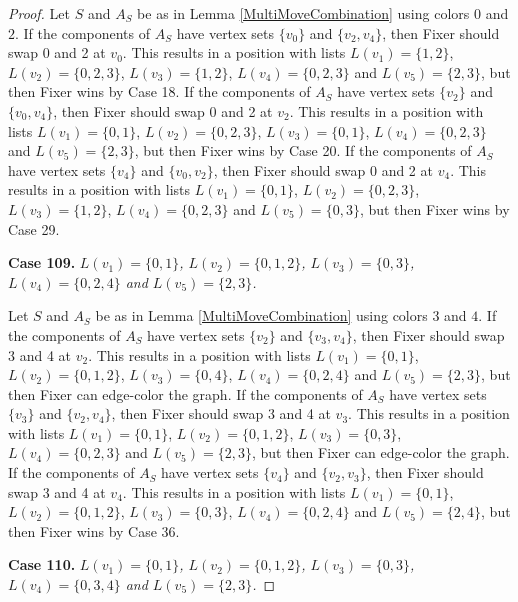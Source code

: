 \documentclass[12pt]{amsart}
\theoremstyle{plain}
\theoremstyle{definition}
\theoremstyle{remark}
\begin{document}
\begin{proof}
Let $S$ and $A_S$ be as in Lemma \ref{MultiMoveCombination} using colors $0$ and $2$. If the components of $A_S$ have vertex sets $\{v_0\}$ and $\{v_2, v_4\}$, then Fixer should swap 0 and 2 at $v_0$. This results in a position with lists $L(v_1) = \{1, 2\}$, $L(v_2) = \{0, 2, 3\}$, $L(v_3) = \{1, 2\}$, $L(v_4) = \{0, 2, 3\}$ and $L(v_5) = \{2, 3\}$, but then Fixer wins by Case 18.
If the components of $A_S$ have vertex sets $\{v_2\}$ and $\{v_0, v_4\}$, then Fixer should swap 0 and 2 at $v_2$. This results in a position with lists $L(v_1) = \{0, 1\}$, $L(v_2) = \{0, 2, 3\}$, $L(v_3) = \{0, 1\}$, $L(v_4) = \{0, 2, 3\}$ and $L(v_5) = \{2, 3\}$, but then Fixer wins by Case 20.
If the components of $A_S$ have vertex sets $\{v_4\}$ and $\{v_0, v_2\}$, then Fixer should swap 0 and 2 at $v_4$. This results in a position with lists $L(v_1) = \{0, 1\}$, $L(v_2) = \{0, 2, 3\}$, $L(v_3) = \{1, 2\}$, $L(v_4) = \{0, 2, 3\}$ and $L(v_5) = \{0, 3\}$, but then Fixer wins by Case 29.

\noindent\textbf{Case 109.  }\textit{$L(v_1) = \{0, 1\}$, $L(v_2) = \{0, 1, 2\}$, $L(v_3) = \{0, 3\}$, $L(v_4) = \{0, 2, 4\}$ and $L(v_5) = \{2, 3\}$.}

Let $S$ and $A_S$ be as in Lemma \ref{MultiMoveCombination} using colors $3$ and $4$. If the components of $A_S$ have vertex sets $\{v_2\}$ and $\{v_3, v_4\}$, then Fixer should swap 3 and 4 at $v_2$. This results in a position with lists $L(v_1) = \{0, 1\}$, $L(v_2) = \{0, 1, 2\}$, $L(v_3) = \{0, 4\}$, $L(v_4) = \{0, 2, 4\}$ and $L(v_5) = \{2, 3\}$, but then Fixer can edge-color the graph.
If the components of $A_S$ have vertex sets $\{v_3\}$ and $\{v_2, v_4\}$, then Fixer should swap 3 and 4 at $v_3$. This results in a position with lists $L(v_1) = \{0, 1\}$, $L(v_2) = \{0, 1, 2\}$, $L(v_3) = \{0, 3\}$, $L(v_4) = \{0, 2, 3\}$ and $L(v_5) = \{2, 3\}$, but then Fixer can edge-color the graph.
If the components of $A_S$ have vertex sets $\{v_4\}$ and $\{v_2, v_3\}$, then Fixer should swap 3 and 4 at $v_4$. This results in a position with lists $L(v_1) = \{0, 1\}$, $L(v_2) = \{0, 1, 2\}$, $L(v_3) = \{0, 3\}$, $L(v_4) = \{0, 2, 4\}$ and $L(v_5) = \{2, 4\}$, but then Fixer wins by Case 36.

\noindent\textbf{Case 110.  }\textit{$L(v_1) = \{0, 1\}$, $L(v_2) = \{0, 1, 2\}$, $L(v_3) = \{0, 3\}$, $L(v_4) = \{0, 3, 4\}$ and $L(v_5) = \{2, 3\}$.}


\end{proof}
\end{document}
